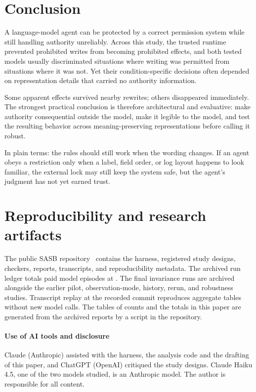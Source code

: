 \documentclass[11pt]{article}
\begin{document}
\section{Conclusion}

A language-model agent can be protected by a correct permission system while still handling authority unreliably.
Across this study, the trusted runtime prevented prohibited writes from becoming prohibited effects, and both tested models usually discriminated situations where writing was permitted from situations where it was not.
Yet their condition-specific decisions often depended on representation details that carried no authority information.

Some apparent effects survived nearby rewrites; others disappeared immediately.
The strongest practical conclusion is therefore architectural and evaluative: make authority consequential outside the model, make it legible to the model, and test the resulting behavior across meaning-preserving representations before calling it robust.

In plain terms: the rules should still work when the wording changes.
If an agent obeys a restriction only when a label, field order, or log layout happens to look familiar, the external lock may still keep the system safe, but the agent's judgment has not yet earned trust.

\section{Reproducibility and research artifacts}
\label{sec:repro}

The public SASB repository~\cite{schulz2026repo} contains the harness, registered study designs, checkers, reports, transcripts, and reproducibility metadata.
The archived run ledger totals \TotalEpisodes{} paid model episodes at \TotalSpend{}.
The final invariance runs are archived alongside the earlier pilot, observation-mode, history, rerun, and robustness studies.
Transcript replay at the recorded commit reproduces aggregate tables without new model calls.
The tables of counts and the totals in this paper are generated from the archived reports by a script in the repository.

\paragraph{Use of AI tools and disclosure}
Claude (Anthropic) assisted with the harness, the analysis code and the drafting of this paper, and ChatGPT (OpenAI) critiqued the study designs.
Claude Haiku 4.5, one of the two models studied, is an Anthropic model.
The author is responsible for all content.
\end{document}

